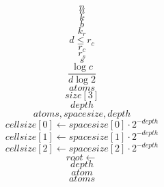 \documentclass{scrreprt}
\begin{document}
\begin{equation}
n
\end{equation}
\begin{equation}
n
\end{equation}
\begin{equation}
k
\end{equation}
\begin{equation}
b
\end{equation}
\begin{equation}
k_r
\end{equation}
\begin{equation}
d \leq r_c
\end{equation}
\begin{equation}
r_c
\end{equation}
\begin{equation}
r_s
\end{equation}
\begin{equation}
s
\end{equation}
\begin{equation}
\frac{\log{c}}{d\log{2}}
\end{equation}
\begin{equation}
atoms
\end{equation}
\begin{equation}
size[3]
\end{equation}
\begin{equation}
depth
\end{equation}
\begin{equation}
atoms, spacesize, depth
\end{equation}
\begin{equation}
cellsize[0] \gets spacesize[0]\cdot2^{-depth}
\end{equation}
\begin{equation}
cellsize[1] \gets spacesize[1]\cdot2^{-depth}
\end{equation}
\begin{equation}
cellsize[2] \gets spacesize[2]\cdot2^{-depth}
\end{equation}
\begin{equation}
root \gets
\end{equation}
\begin{equation}
depth
\end{equation}
\begin{equation}
atom
\end{equation}
\begin{equation}
atoms
\end{equation}
\end{document}
